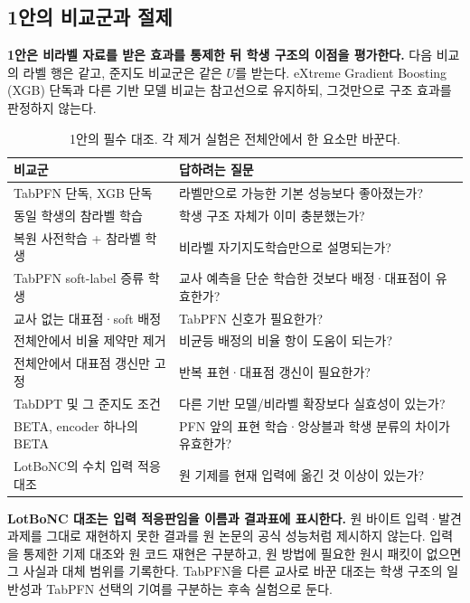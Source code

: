 \subsection{1안의 비교군과 절제}
\textbf{1안은 비라벨 자료를 받은 효과를 통제한 뒤 학생 구조의 이점을 평가한다.} 다음 비교의 라벨 행은 같고, 준지도 비교군은 같은 $U$를 받는다. eXtreme Gradient Boosting (XGB) 단독과 다른 기반 모델 비교는 참고선으로 유지하되, 그것만으로 구조 효과를 판정하지 않는다.
\begin{table}[H]\centering\small
\caption{1안의 필수 대조. 각 제거 실험은 전체안에서 한 요소만 바꾼다.}
\begin{tabularx}{\linewidth}{p{.32\linewidth}Y}
\toprule
비교군 & 답하려는 질문\\\midrule
TabPFN 단독, XGB 단독 & 라벨만으로 가능한 기본 성능보다 좋아졌는가?\\
동일 학생의 참라벨 학습 & 학생 구조 자체가 이미 충분했는가?\\
복원 사전학습 + 참라벨 학생 & 비라벨 자기지도학습만으로 설명되는가?\\
TabPFN soft-label 증류 학생 & 교사 예측을 단순 학습한 것보다 배정·대표점이 유효한가?\\
교사 없는 대표점·soft 배정 & TabPFN 신호가 필요한가?\\
전체안에서 비율 제약만 제거 & 비균등 배정의 비율 항이 도움이 되는가?\\
전체안에서 대표점 갱신만 고정 & 반복 표현·대표점 갱신이 필요한가?\\
TabDPT 및 그 준지도 조건 & 다른 기반 모델/비라벨 확장보다 실효성이 있는가?\\
BETA, encoder 하나의 BETA & PFN 앞의 표현 학습·앙상블과 학생 분류의 차이가 유효한가?\\
LotBoNC의 수치 입력 적응 대조 & 원 기제를 현재 입력에 옮긴 것 이상이 있는가?\\\bottomrule
\end{tabularx}
\end{table}

\textbf{LotBoNC 대조는 입력 적응판임을 이름과 결과표에 표시한다.} 원 바이트 입력·발견 과제를 그대로 재현하지 못한 결과를 원 논문의 공식 성능처럼 제시하지 않는다. 입력을 통제한 기제 대조와 원 코드 재현은 구분하고, 원 방법에 필요한 원시 패킷이 없으면 그 사실과 대체 범위를 기록한다. TabPFN을 다른 교사로 바꾼 대조는 학생 구조의 일반성과 TabPFN 선택의 기여를 구분하는 후속 실험으로 둔다.

